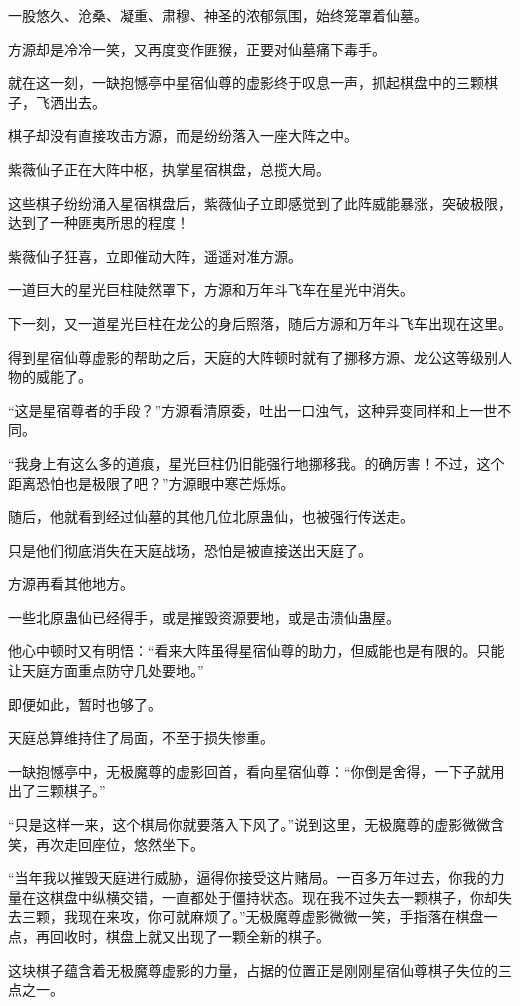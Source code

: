 \begin{this_body}
一股悠久、沧桑、凝重、肃穆、神圣的浓郁氛围，始终笼罩着仙墓。

方源却是冷冷一笑，又再度变作匪猴，正要对仙墓痛下毒手。

就在这一刻，一缺抱憾亭中星宿仙尊的虚影终于叹息一声，抓起棋盘中的三颗棋子，飞洒出去。

棋子却没有直接攻击方源，而是纷纷落入一座大阵之中。

紫薇仙子正在大阵中枢，执掌星宿棋盘，总揽大局。

这些棋子纷纷涌入星宿棋盘后，紫薇仙子立即感觉到了此阵威能暴涨，突破极限，达到了一种匪夷所思的程度！

紫薇仙子狂喜，立即催动大阵，遥遥对准方源。

一道巨大的星光巨柱陡然罩下，方源和万年斗飞车在星光中消失。

下一刻，又一道星光巨柱在龙公的身后照落，随后方源和万年斗飞车出现在这里。

得到星宿仙尊虚影的帮助之后，天庭的大阵顿时就有了挪移方源、龙公这等级别人物的威能了。

“这是星宿尊者的手段？”方源看清原委，吐出一口浊气，这种异变同样和上一世不同。

“我身上有这么多的道痕，星光巨柱仍旧能强行地挪移我。的确厉害！不过，这个距离恐怕也是极限了吧？”方源眼中寒芒烁烁。

随后，他就看到经过仙墓的其他几位北原蛊仙，也被强行传送走。

只是他们彻底消失在天庭战场，恐怕是被直接送出天庭了。

方源再看其他地方。

一些北原蛊仙已经得手，或是摧毁资源要地，或是击溃仙蛊屋。

他心中顿时又有明悟：“看来大阵虽得星宿仙尊的助力，但威能也是有限的。只能让天庭方面重点防守几处要地。”

即便如此，暂时也够了。

天庭总算维持住了局面，不至于损失惨重。

一缺抱憾亭中，无极魔尊的虚影回首，看向星宿仙尊：“你倒是舍得，一下子就用出了三颗棋子。”

“只是这样一来，这个棋局你就要落入下风了。”说到这里，无极魔尊的虚影微微含笑，再次走回座位，悠然坐下。

“当年我以摧毁天庭进行威胁，逼得你接受这片赌局。一百多万年过去，你我的力量在这棋盘中纵横交错，一直都处于僵持状态。现在我不过失去一颗棋子，你却失去三颗，我现在来攻，你可就麻烦了。”无极魔尊虚影微微一笑，手指落在棋盘一点，再回收时，棋盘上就又出现了一颗全新的棋子。

这块棋子蕴含着无极魔尊虚影的力量，占据的位置正是刚刚星宿仙尊棋子失位的三点之一。


\end{this_body}
